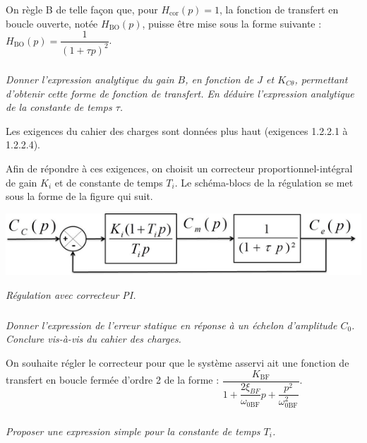 \documentclass[10pt,fleqn]{article} %
\begin{document}
On règle B de telle façon que, pour $H_{\text{cor}}(p)=1$, la fonction de transfert en boucle ouverte, notée $H_{\text{BO}}(p)$, puisse être mise sous la forme suivante : 
$H_{\text{BO}}(p)=\dfrac{1}{\left(1+\tau p\right)^2}$.



\subparagraph{}
\textit{Donner l’expression analytique du gain $B$, en fonction de $J$ et $K_{C\theta}$, permettant d’obtenir cette
forme de fonction de transfert. En déduire l’expression analytique de la constante de temps $\tau$.}
\ifprof
\begin{corrige}
\end{corrige}
\else
\fi

\vspace{.25cm}

Les exigences du cahier des charges sont données plus haut (exigences 1.2.2.1 à 1.2.2.4).

Afin de répondre à ces exigences, on choisit un correcteur proportionnel-intégral de gain $K_i$ et de constante de temps $T_i$. Le schéma-blocs de la régulation se met sous la forme de la figure qui suit.

\begin{center}
\includegraphics[width=.55\linewidth]{images/Sujet/images/fig_08}

\textit{Régulation avec correcteur PI.}
\end{center}


\subparagraph{}
\textit{Donner l’expression de l’erreur statique en réponse à un échelon d'amplitude $C_0$. Conclure vis-à-vis du cahier des charges.}
\ifprof
\begin{corrige}
\end{corrige}
\else
\fi

\vspace{.25cm}

On souhaite régler le correcteur pour que le système asservi ait une fonction de transfert en boucle fermée
d’ordre 2 de la forme :
$\dfrac{K_{\text{BF}}}{1+\dfrac{2\xi_{BF}}{\omega_{0\text{BF}}}p+\dfrac{p^2}{\omega_{0\text{BF}}^2}}$.


\subparagraph{}
\textit{Proposer une expression simple pour la constante de temps $T_i$.}
\ifprof
\begin{corrige}
\end{corrige}
\else
\fi
\end{document}
